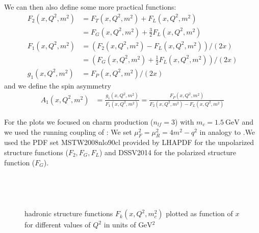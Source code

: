 We can then also define some more practical functions:
\begin{align}
F_{2}(x,Q^2,m^2) &= F_{T}(x,Q^2,m^2) + F_{L}(x,Q^2,m^2)\\
 &= F_{G}(x,Q^2,m^2) + \frac 3 2 F_{L}(x,Q^2,m^2)\\
F_1(x,Q^2,m^2) &= (F_{2}(x,Q^2,m^2)-F_L(x,Q^2,m^2))/(2x)\\
 &= \left(F_{G}(x,Q^2,m^2)+\frac 1 2 F_{L}(x,Q^2,m^2)\right)/(2x)\\
g_1(x,Q^2,m^2) &= F_{P}(x,Q^2,m^2)/(2x)
\end{align}
and we define the spin asymmetry
\begin{align}
A_1(x,Q^2,m^2) &= \frac{g_1(x,Q^2,m^2)}{F_1(x,Q^2,m^2)} = \frac{F_P(x,Q^2,m^2)}{F_2(x,Q^2,m^2)-F_L(x,Q^2,m^2)}
\end{align}

For the plots we focused on charm production ($n_{lf}=3$) with $m_c=\SI{1.5}{\GeV}$ and we used the running coupling of : We set $\mu_F^2=\mu_R^2=4m^2-q^2$ in analogy to \cite{Laenen1993162}.We used the PDF set MSTW2008nlo90cl\cite{Martin:2009iq,Martin:2009bu,Martin:2010db} provided by LHAPDF\cite{LHAPDF6} for the unpolarized structure functions ($F_2,F_G,F_L$) and DSSV2014\cite{PhysRevLett.113.012001} for the polarized structure function ($F_G$).


\pagebreak
\begin{figure}[ht!]
\centering
\begin{subfigure}[t]{\textwidth}
	
\end{subfigure}\\%
\begin{subfigure}[t]{\textwidth}
	
\end{subfigure}\\%
\begin{subfigure}[t]{\textwidth}
	
\end{subfigure}
\caption{hadronic structure functions $F_{k}(x,Q^2,m_c^2)$ plotted as function of $x$ for different values of $Q^2$ in units of $\si{\GeV^2}$}\label{fig:F001}
\end{figure}

\clearpage
\pagebreak
